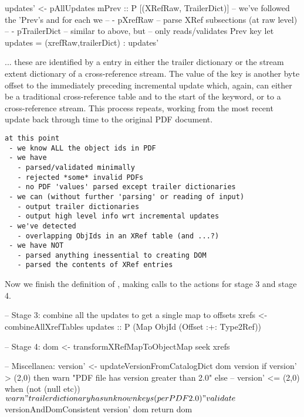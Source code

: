 \begin{code}
    updates' <- pAllUpdates mPrev :: P [(XRefRaw, TrailerDict)]
       -- we've followed the 'Prev's and for each we
       --   - pXrefRaw     -- parse XRef subsections (at raw level)
       --   - pTrailerDict -- similar to above, but
       --                     only reads/validates Prev key
    let updates = (xrefRaw,trailerDict) : updates'
\end{code}

... these are identified by a  entry in either the trailer
dictionary or the stream extent dictionary of a cross-reference stream. The
value of the  key is another byte offset to the immediately
preceding incremental update which, again, can either be a traditional
cross-reference table and to the start of the  keyword, or to a
cross-reference stream. This process repeats, working from the most recent
update back through time to the original PDF document.

\begin{lstlisting}[style=meta]
at this point
 - we know ALL the object ids in PDF
 - we have
   - parsed/validated minimally
   - rejected *some* invalid PDFs
   - no PDF 'values' parsed except trailer dictionaries
 - we can (without further 'parsing' or reading of input)
   - output trailer dictionaries
   - output high level info wrt incremental updates
 - we've detected
   - overlapping ObjIds in an XRef table (and ...?)
 - we have NOT
   - parsed anything inessential to creating DOM
   - parsed the contents of XRef entries
\end{lstlisting}

Now we finish the definition of , making calls
to the actions for stage 3 and stage 4.

\begin{code}  
    -- Stage 3: combine all the updates to get a single map to offsets
    xrefs <- combineAllXrefTables updates
             :: P (Map ObjId (Offset :+: Type2Ref))

    -- Stage 4:
    dom <- transformXRefMapToObjectMap seek xrefs
    
    -- Miscellanea:
    version' <- updateVersionFromCatalogDict dom version
    if version' > (2,0) then
      warn "PDF file has version greater than 2.0"
    else
      -- version' <= (2,0)
      when (not (null etc)) $
        warn "trailer dictionary has unknown keys (per PDF 2.0)"
    validate $
      versionAndDomConsistent version' dom
    return dom
\end{code}

